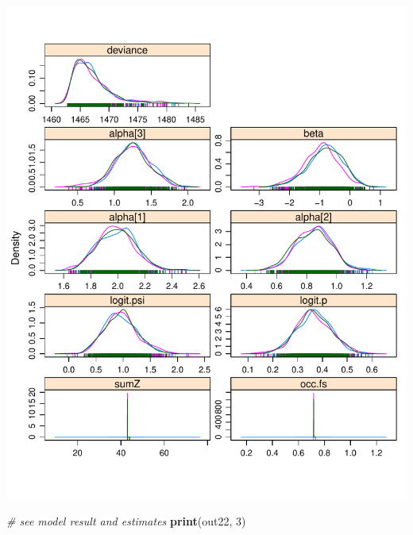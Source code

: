 \documentclass[]{book}
\newenvironment{Shaded}{\begin{snugshade}}{\end{snugshade}}
\newcommand{\KeywordTok}[1]{\textcolor[rgb]{0.13,0.29,0.53}{\textbf{{#1}}}}
\newcommand{\DecValTok}[1]{\textcolor[rgb]{0.00,0.00,0.81}{{#1}}}
\newcommand{\CommentTok}[1]{\textcolor[rgb]{0.56,0.35,0.01}{\textit{{#1}}}}
\newcommand{\NormalTok}[1]{{#1}}
\begin{document}
\includegraphics{Simul-Machalilla-book_files/figure-latex/Bayesian-3.pdf}

\begin{Shaded}
\begin{Highlighting}[]
\CommentTok{# see model result and estimates  }
\KeywordTok{print}\NormalTok{(out22, }\DecValTok{3}\NormalTok{)}
\end{Highlighting}
\end{Shaded}
\end{document}
